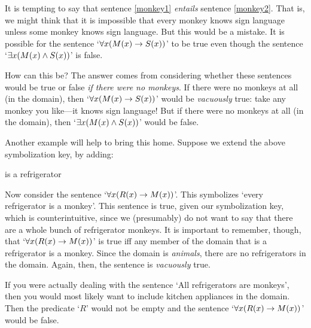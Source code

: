 It is tempting to say that sentence \ref{monkey1} \emph{entails} sentence \ref{monkey2}. That is, we might think that it is impossible that every monkey knows sign language unless some monkey knows sign language. But this would be a mistake. It is possible for the sentence `$\forall x(\mathord{M}(x) \rightarrow \mathord{S}(x))$' to be true even though the sentence `$\exists x(\mathord{M}(x) \wedge \mathord{S}(x))$' is false.

How can this be? The answer comes from considering whether these sentences would be true or false \emph{if there were no monkeys}. If there were no monkeys at all (in the domain), then `$\forall x(\mathord{M}(x) \rightarrow \mathord{S}(x))$' would be \emph{vacuously} true: take any monkey you like---it knows sign language! But if there were no monkeys at all (in the domain), then `$\exists x(\mathord{M}(x) \wedge \mathord{S}(x))$' would be false.

Another example will help to bring this home. Suppose we extend the above symbolization key, by adding:
	\begin{ekey}
		\item[\atom{R}{x}]  is a refrigerator
	\end{ekey}
Now consider the sentence `$\forall x(\mathord{R}(x) \rightarrow \mathord{M}(x))$'. This symbolizes `every refrigerator is a monkey'. This sentence is true, given our symbolization key, which is counterintuitive, since we (presumably) do not want to say that there are a whole bunch of refrigerator monkeys. It is important to remember, though, that `$\forall x(\mathord{R}(x) \rightarrow \mathord{M}(x))$' is true iff any member of the domain that is a refrigerator is a monkey. Since the domain is \emph{animals}, there are no refrigerators in the domain. Again, then, the sentence is \emph{vacuously} true. 

If you were actually dealing with the sentence `All refrigerators are monkeys', then you would most likely want to include kitchen appliances in the domain. Then the predicate `$R$' would not be empty and the sentence `$\forall x(\mathord{R}(x) \rightarrow \mathord{M}(x))$' would be false.


